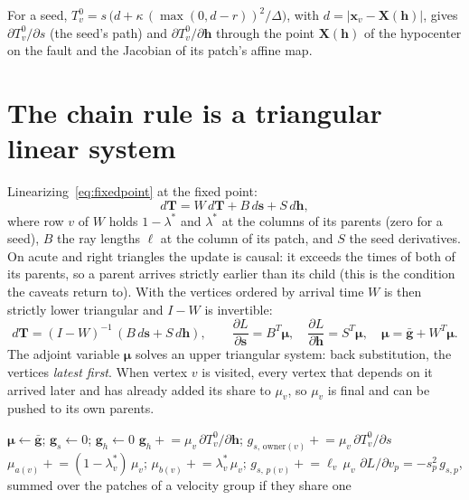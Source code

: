 \documentclass[11pt]{article}
\newcommand{\T}{\bm{T}}
\newcommand{\s}{\bm{s}}
\newcommand{\h}{\bm{h}}
\begin{document}
For a seed, $T^0_v = s\,\big(d + \kappa\,(\max(0, d - r))^2/\Delta\big)$, with
$d = |\bm{x}_v - \bm{X}(\h)|$, gives $\partial T^0_v/\partial s$ (the seed's path) and
$\partial T^0_v/\partial \h$ through the point $\bm{X}(\h)$ of the hypocenter on the fault and the
Jacobian of its patch's affine map.

\section{The chain rule is a triangular linear system}

Linearizing~\eqref{eq:fixedpoint} at the fixed point:
\begin{equation}
d\T = W\, d\T + B\, d\s + S\, d\h ,
\label{eq:linear}
\end{equation}
where row $v$ of $W$ holds $1-\lambda^\ast$ and $\lambda^\ast$ at the columns of its parents (zero for
a seed), $B$ the ray lengths $\ell$ at the column of its patch, and $S$ the seed derivatives.
On acute and right triangles the update is causal: it exceeds the times of both of its parents,
so a parent arrives strictly earlier than its child (this is the condition the caveats return to).
With the vertices ordered by arrival time $W$ is then strictly lower triangular and $I - W$ is
invertible:
\[
d\T = (I - W)^{-1}\,(B\, d\s + S\, d\h),
\qquad
\frac{\partial L}{\partial \s} = B^{T} \bm\mu, \quad
\frac{\partial L}{\partial \h} = S^{T} \bm\mu, \quad
\bm\mu = \bar{\bm g} + W^{T} \bm\mu .
\]
The adjoint variable $\bm\mu$ solves an upper triangular system: back substitution, the vertices
\emph{latest first}. When vertex $v$ is visited, every vertex that depends on it arrived later and
has already added its share to $\mu_v$, so $\mu_v$ is final and can be pushed to its own parents.

\begin{algorithm}[h]
\caption{The backward pass, for one sample}
\begin{algorithmic}[1]
\State $\bm\mu \gets \bar{\bm g}$;\; $\bm g_s \gets 0$;\; $\bm g_h \gets 0$
     \State $\bm g_h \mathrel{+}= \mu_v\, \partial T^0_v/\partial\h$;\quad
            $g_{s,\,\text{owner}(v)} \mathrel{+}= \mu_v\, \partial T^0_v/\partial s$
  \Else
     \State $\mu_{a(v)} \mathrel{+}= (1-\lambda^\ast_v)\,\mu_v$;\quad
            $\mu_{b(v)} \mathrel{+}= \lambda^\ast_v\,\mu_v$;\quad
            $g_{s,\,p(v)} \mathrel{+}= \ell_v\,\mu_v$
  \EndIf
\EndFor
\State $\partial L/\partial v_p = -s_p^2\, g_{s,p}$, summed over the patches of a velocity group if they share one
\end{algorithmic}
\end{algorithm}
\end{document}
